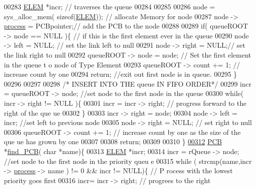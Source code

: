 \begin{DoxyCode}
{00283         \hyperlink{structpage}{ELEM} *incr; \textcolor{comment}{// traverses the queue}
00284         
00285         
00286         node = sys\_alloc\_mem( \textcolor{keyword}{sizeof}(\hyperlink{structpage}{ELEM})); \textcolor{comment}{// allocate Memory for node}
00287         node -> \hyperlink{structprocess}{process} = PCBpointer;\textcolor{comment}{// add the PCB to the node}
00288         
00289         \textcolor{keywordflow}{if}( queueROOT -> node == NULL )\{ \textcolor{comment}{// if this is the first element ever in 
      the queue}
00290                 node -> left = NULL; \textcolor{comment}{// set the link left to null}
00291                 node -> right = NULL;\textcolor{comment}{// set the link right to null}
00292                 queueROOT -> node = node; \textcolor{comment}{// Set the first element in the queue t
      o node of Type Element}
00293                 queueROOT -> count += 1; \textcolor{comment}{// increase count by one}
00294                 \textcolor{keywordflow}{return}; \textcolor{comment}{//exit out first node is in queue.}
00295         \}
00296         
00297         
00298         \textcolor{comment}{/* INSERT INTO THE queue IN FIFO ORDER*/}
00299         incr = queueROOT -> node; \textcolor{comment}{//set node to the first node in the queue}
00300         \textcolor{keywordflow}{while}( incr -> right != NULL )\{
00301                 incr = incr -> right; \textcolor{comment}{// progress forward to the right of the que
      ue}
00302         \}
00303          incr -> right = node;
00304          node -> left = incr; \textcolor{comment}{//set left to previous node}
00305          node -> right = NULL; \textcolor{comment}{// set right to null }
00306          queueROOT -> count += 1; \textcolor{comment}{// increase count by one as the size of the que
      ue has grown by one}
00307          
00308          \textcolor{keywordflow}{return};
00309 
00310 \}
\hypertarget{mpx__r2_8c_source_l00312}{}\hyperlink{mpx__r2_8h_a612a6abcb66c688a32f33abc93ff3990}{00312} \hyperlink{structprocess}{PCB} *\hyperlink{mpx__r2_8c_a612a6abcb66c688a32f33abc93ff3990}{find_PCB}( \textcolor{keywordtype}{char} *name)\{
00313         \hyperlink{structpage}{ELEM} *incr;
00314         incr =  rQueue -> node; \textcolor{comment}{//set node to the first node in the priority queu
      e}
00315         \textcolor{keywordflow}{while} ( strcmp(name,incr -> \hyperlink{structprocess}{process} -> name ) != 0 && incr != NULL)\{ \textcolor{comment}{// P
      rocess with the lowest priority goes first}
00316                         incr= incr -> right; \textcolor{comment}{// progrees to the right }
}
\end{DoxyCode}
